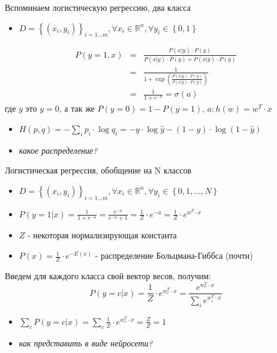 \documentclass[10pt]{beamer}
\begin{document}
\begin{frame}{Вспоминаем логистическую регрессию, два класса}

\begin{itemize}
	\item $D = \left\{ \left( x_i, y_i \right) \right\}_{i=1\ldots m}, \forall x_i \in \mathbb{R}^n, \forall y_i \in \left\{ 0, 1 \right\}$
\end{itemize}
\begin{eqnarray*}
P(y = 1, x) &=& \frac{P(x | y)\cdot P(y)}{P(x | y)\cdot P(y) + P(x | \overline{y})\cdot P(\overline{y})} \\
&=& \frac{1}{1 + \exp\left( \frac{P(x | y)\cdot P(y)}{P(x | \overline{y})\cdot P(\overline{y})} \right)} \\
&=& \frac{1}{1 + e^{-a}} = \sigma(a)
\end{eqnarray*}
где $\overline{y}$ это $y = 0$, а так же $P(y = 0) = 1 - P(y = 1)$, $a: h(w) = w^T \cdot x$
\begin{itemize}
	\item $H(p, q) = -\sum_i p_i \cdot \log q_i = -y\cdot\log\hat{y} - (1 - y)\cdot\log (1 - \hat{y})$
	\item \textit{какое распределение?}
\end{itemize}

\end{frame}


\begin{frame}{Логистическая регрессия, обобщение на N классов}

\begin{itemize}
	\item $D = \left\{ \left( x_i, y_i \right) \right\}_{i=1\ldots m}, \forall x_i \in \mathbb{R}^n, \forall y_i \in \left\{ 0, 1, \ldots, N \right\}$
	\item $P(y = 1 | x) = \frac{1}{1 + e^{-a}} = \frac{e^{-a}}{e^{-a} + 1} = \frac{1}{Z} \cdot e^{-a} = \frac{1}{Z} \cdot e^{w^T \cdot x}$
	\item $Z$ - некоторая нормализирующая константа
	\item $P(x) = \frac{1}{Z}\cdot e^{-E(x)}$ - распределение Больцмана-Гиббса (почти)
\end{itemize}
Введем для каждого класса свой вектор весов, получим:
\begin{equation}
P(y = c | x) = \frac{1}{Z} \cdot e^{w_{c}^{T} \cdot x} = \dfrac{e^{w_{c}^{T} \cdot x}}{\sum_i e^{w_{i}^{T} \cdot x}}
\end{equation}
\begin{itemize}
	\item $\sum_c P(y = c | x) = \sum_c \frac{1}{Z} \cdot e^{w_{c}^{T} \cdot x} = \frac{Z}{Z} = 1$
	\item \textit{как представить в виде нейросети?}
\end{itemize}

\end{frame}
\end{document}
